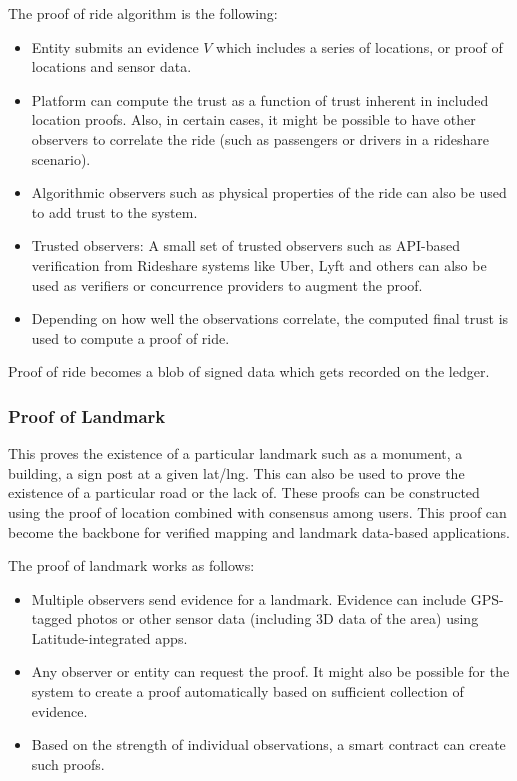 The proof of ride algorithm is the following:
\begin{itemize}
    \item Entity submits an evidence $V$ which includes a series of locations, or proof of locations and sensor data.
    \item Platform can compute the trust as a function of trust inherent in included location proofs. Also, in certain
        cases, it might be possible to have other observers to correlate the ride (such as passengers or drivers in a
        rideshare scenario).
    \item Algorithmic observers such as physical properties of the ride can also be used to add trust to the system.
    \item Trusted observers: A small set of trusted observers such as API-based verification from Rideshare systems like
        Uber, Lyft and others can also be used as verifiers or concurrence providers to augment the proof.
    \item Depending on how well the observations correlate, the computed final trust is used to compute a proof of ride.
\end{itemize}

Proof of ride becomes a blob of signed data which gets recorded on the ledger.

\subsubsection{Proof of Landmark}

This proves the existence of a particular landmark such as a monument, a building, a sign post at a given lat/lng. This
can also be used to prove the existence of a particular road or the lack of. These proofs can be constructed using the
proof of location combined with consensus among users.  This proof can become the backbone for verified mapping and
landmark data-based applications.

The proof of landmark works as follows:

\begin{itemize}
    \item Multiple observers send evidence for a landmark. Evidence can include GPS-tagged photos or other sensor data
        (including 3D data of the area) using Latitude-integrated apps.
    \item Any observer or entity can request the proof. It might also
        be possible for the system to create a proof automatically based on sufficient collection of evidence.
    \item Based on the strength of individual observations, a smart contract can create such proofs.
\end{itemize}

